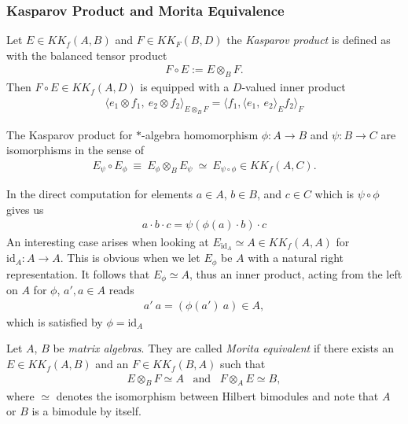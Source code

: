 \subsubsection{Kasparov Product and Morita Equivalence}
\begin{definition}
    Let $E \in KK_f(A, B)$ and $F \in KK_F(B, D)$ the \textit{Kasparov product} is defined as
    with the balanced tensor product
    \begin{align}
        F \circ E := E \otimes _B F.
    \end{align}
    Then $F\circ E \in KK_f(A,D)$ is equipped with a $D$-valued inner product
    \begin{align}
        \langle e_1 \otimes f_1,\ e_2 \otimes f_2\rangle _{E\otimes _B F} =
        \langle f_1,\langle e_1,\ e_2\rangle _E f_2\rangle _F
    \end{align}
\end{definition}

The Kasparov product for $*$-algebra homomorphism $\phi: A \rightarrow B$ and
$\psi: B \rightarrow C$ are isomorphisms in the sense of
\begin{align}
                E_{\psi} \circ E_{\phi}\ \equiv\ E_{\phi} \otimes _B E_{\psi}\
                \simeq\
                E_{\psi \circ \phi} \in KK_f(A,C).
\end{align}

In the direct computation for elements $a \in A$, $b\in B$, and $c\in C$ which
is $\psi \circ \phi$ gives us
\begin{align}
a \cdot b \cdot c = \psi(\phi (a) \cdot b) \cdot c
\end{align}
An interesting case arises when looking at $E_{\text{id}_A} \simeq A \in KK_f(A,A)$ for
$\text{id}_A: A \rightarrow A$. This is obvious when we let $E_{\phi}$ be $A$
with a natural right representation. It follows that $E_{\phi}\simeq A$, thus
an inner product, acting from the left on $A$ for $\phi$, $a', a\in A$ reads
\begin{align}
    a'\ a = (\phi(a')\ a) \in A,
\end{align}
which is satisfied by $\phi = \text{id}_A$

\begin{definition}
    Let $A$, $B$ be \textit{matrix algebras}. They are called \textit{Morita equivalent} if there
    exists an $E \in KK_f(A, B)$ and an $F \in KK_f(B, A)$ such that
    \begin{align}
        E \otimes _B F \simeq A \;\;\; \text{and} \;\;\; F \otimes _A E \simeq
        B,
    \end{align}
    where $\simeq$ denotes the isomorphism between Hilbert bimodules and note
    that $A$ or $B$ is a bimodule by itself.
\end{definition}

